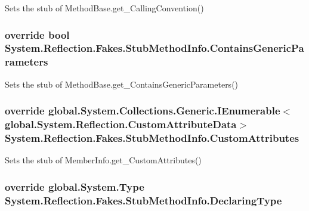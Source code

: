 Sets the stub of Method\-Base.\-get\-\_\-\-Calling\-Convention()

\hypertarget{class_system_1_1_reflection_1_1_fakes_1_1_stub_method_info_a24d3d2cb3198da6a776e5f005d6d90b7}{
\subsubsection[{Contains\-Generic\-Parameters}]{\setlength{\rightskip}{0pt plus 5cm}override bool System.\-Reflection.\-Fakes.\-Stub\-Method\-Info.\-Contains\-Generic\-Parameters\hspace{0.3cm}{\ttfamily [get]}}}\label{class_system_1_1_reflection_1_1_fakes_1_1_stub_method_info_a24d3d2cb3198da6a776e5f005d6d90b7}


Sets the stub of Method\-Base.\-get\-\_\-\-Contains\-Generic\-Parameters()

\hypertarget{class_system_1_1_reflection_1_1_fakes_1_1_stub_method_info_ace2e6e7cc35de2335a0254fcd02c2f75}{
\subsubsection[{Custom\-Attributes}]{\setlength{\rightskip}{0pt plus 5cm}override global.\-System.\-Collections.\-Generic.\-I\-Enumerable$<$global.\-System.\-Reflection.\-Custom\-Attribute\-Data$>$ System.\-Reflection.\-Fakes.\-Stub\-Method\-Info.\-Custom\-Attributes\hspace{0.3cm}{\ttfamily [get]}}}\label{class_system_1_1_reflection_1_1_fakes_1_1_stub_method_info_ace2e6e7cc35de2335a0254fcd02c2f75}


Sets the stub of Member\-Info.\-get\-\_\-\-Custom\-Attributes()

\hypertarget{class_system_1_1_reflection_1_1_fakes_1_1_stub_method_info_a0e7caf449323891802774757deca06e3}{
\subsubsection[{Declaring\-Type}]{\setlength{\rightskip}{0pt plus 5cm}override global.\-System.\-Type System.\-Reflection.\-Fakes.\-Stub\-Method\-Info.\-Declaring\-Type\hspace{0.3cm}{\ttfamily [get]}}}\label{class_system_1_1_reflection_1_1_fakes_1_1_stub_method_info_a0e7caf449323891802774757deca06e3}


